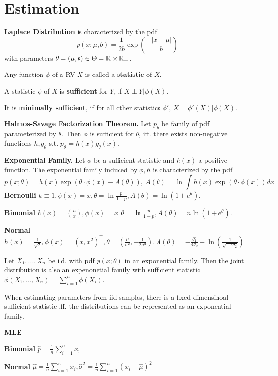 \section{Estimation}
\textbf{Laplace Distribution} is characterized by the pdf
\[p(x; \mu, b) = \frac{1}{2b}\exp\left(-\frac{|x-\mu|}{b}\right)\]
with parameters \(\theta = (\mu, b) \in \Theta = \mathbb{R} \times \mathbb{R}_+\).

Any function \(\phi\) of a RV \(X\) is called a \textbf{statistic} of \(X\).

A statistic \(\phi\) of \(X\) is \textbf{sufficient} for \(Y\), if \(X \perp Y | \phi(X)\).

It is \textbf{minimally sufficient}, if for all other statistics \(\phi'\), \(X \perp \phi'(X) | \phi(X)\).

\textbf{Halmos-Savage Factorization Theorem.} Let \(p_\theta\) be family of pdf parameterized by \(\theta\). 
Then \(\phi\) is sufficient for \(\theta\), iff. there exists non-negative functions \(h, g_\theta\) s.t.
\(p_\theta = h(x)g_\theta(x)\).

\textbf{Exponential Family.} Let \(\phi\) be a sufficient statistic and \(h(x)\) a positive function. 
The exponential family induced by \(\phi, h\) is characterized by the pdf
\[p(x; \theta) = h(x)\exp(\theta\cdot\phi(x)-A(\theta)), \ A(\theta) = \ln \int h(x) \exp(\theta \cdot \phi(x))dx\]
\textbf{Bernoulli} \(h \equiv 1, \phi(x) = x, \theta = \ln \frac{p}{1-p}, A(\theta) = \ln(1+e^\theta)\).

\textbf{Binomial} \(h(x) = \binom{n}{x}, \phi(x) = x, \theta =  \ln \frac{p}{1-p}, A(\theta) = n \ln(1+e^\theta)\).

\textbf{Normal} \(h(x) = \frac{1}{\sqrt{2}}, \phi(x) = (x, x^2)^\top, \theta = \left(\frac{\mu}{\sigma^2}, -\frac{1}{2\sigma^2}\right), 
A(\theta) = -\frac{\theta_1^2}{4\theta_2} + \ln\left(\frac{1}{\sqrt{-2\theta_2}}\right)\)  

Let \(X_1, ..., X_n\) be iid. with pdf \(p(x; \theta)\) in an exponential family. 
Then the joint distribution is also an expenonetial family 
with sufficient statistic \(\phi(X_1, ..., X_n) = \sum_{i = 1}^n \phi(X_i)\).

When estimating parameters from iid samples, there is a fixed-dimensinoal sufficient statistic 
iff. the distributions can be represented as an exponential family.

\textbf{MLE}

\textbf{Binomial} \(\hat{p} = \frac{1}{n}\sum_{i = 1}^n x_i\)

\textbf{Normal} \(\hat{\mu} = \frac{1}{n}\sum_{i= 1}^n x_i, \hat{\sigma}^2 = \frac{1}{n}\sum_{i = 1}^n (x_i - \hat{\mu})^2\)


